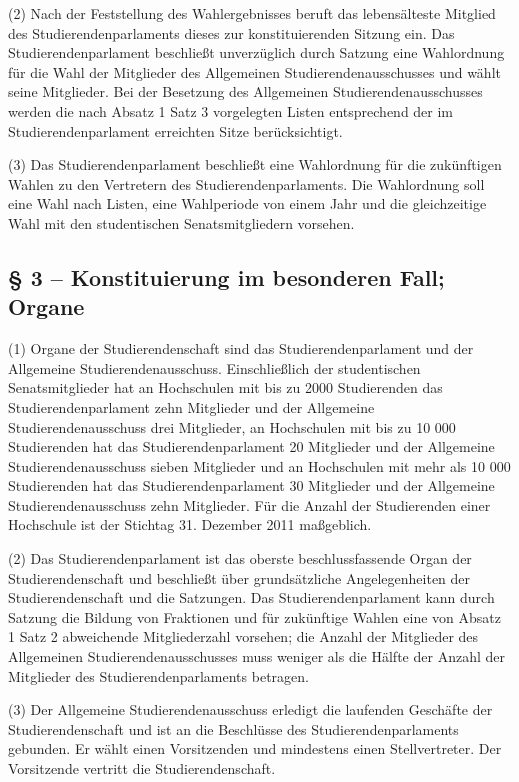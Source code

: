 \documentclass[
10pt,
a4paper,
twoside,								%
titlepage=false,							%
draft=false								%
]{scrartcl}
\begin{document}
(2) Nach der Feststellung des Wahlergebnisses beruft das lebensälteste Mitglied des Studierendenparlaments dieses zur konstituierenden Sitzung ein. Das Studierendenparlament beschließt unverzüglich durch Satzung eine Wahlordnung für die Wahl der Mitglieder des Allgemeinen Studierendenausschusses und wählt seine Mitglieder. Bei der Besetzung des Allgemeinen Studierendenausschusses werden die nach Absatz 1 Satz 3 vorgelegten Listen entsprechend der im Studierendenparlament erreichten Sitze berücksichtigt.

(3) Das Studierendenparlament beschließt eine Wahlordnung für die zukünftigen Wahlen zu den Vertretern des Studierendenparlaments. Die Wahlordnung soll eine Wahl nach Listen, eine Wahlperiode von einem Jahr und die gleichzeitige Wahl mit den studentischen Senatsmitgliedern vorsehen.


\subsection*{§ 3 – Konstituierung im besonderen Fall; Organe}

(1) Organe der Studierendenschaft sind das Studierendenparlament und der Allgemeine Studierendenausschuss. Einschließlich der studentischen Senatsmitglieder hat an Hochschulen mit bis zu 2000 Studierenden das Studierendenparlament zehn Mitglieder und der Allgemeine Studierendenausschuss drei Mitglieder, an Hochschulen mit bis zu 10 000 Studierenden hat das Studierendenparlament 20 Mitglieder und der Allgemeine Studierendenausschuss sieben Mitglieder und an Hochschulen mit mehr als 10 000 Studierenden hat das Studierendenparlament 30 Mitglieder und der Allgemeine Studierendenausschuss zehn Mitglieder. Für die Anzahl der Studierenden einer Hochschule ist der Stichtag 31. Dezember 2011 maßgeblich.

(2) Das Studierendenparlament ist das oberste beschlussfassende Organ der Studierendenschaft und beschließt über grundsätzliche Angelegenheiten der Studierendenschaft und die Satzungen. Das Studierendenparlament kann durch Satzung die Bildung von Fraktionen und für zukünftige Wahlen eine von Absatz 1 Satz 2 abweichende Mitgliederzahl vorsehen; die Anzahl der Mitglieder des Allgemeinen Studierendenausschusses muss weniger als die Hälfte der Anzahl der Mitglieder des
Studierendenparlaments betragen.

(3) Der Allgemeine Studierendenausschuss erledigt die laufenden Geschäfte der Studierendenschaft und ist an die Beschlüsse des Studierendenparlaments gebunden. Er wählt einen Vorsitzenden und mindestens einen Stellvertreter. Der Vorsitzende vertritt die Studierendenschaft.
\end{document}
